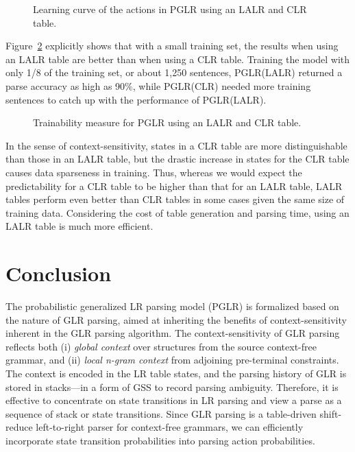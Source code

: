 \begin{figure}[htbp]
  \begin{center}
    \leavevmode
    \epsfxsize=12cm
    
    \vspace*{2.5em}
    \epsfxsize=12cm
    \caption{Learning curve of the actions in PGLR using an LALR and
      CLR table.}
    \label{fig:train-para}
  \end{center}
\end{figure}

Figure~\ref{fig:lalr-clr} explicitly shows that with a small training
set, the results when using an LALR table are better than when using a
CLR table. Training the model with only 1/8 of the training set, or
about 1,250 sentences, PGLR(LALR) returned a parse accuracy as high as
90\%, while PGLR(CLR) needed more training sentences to catch up with
the performance of PGLR(LALR).

\begin{figure}[htbp]
  \begin{center}
    \leavevmode
    \epsfxsize=12cm
    \caption{Trainability measure for PGLR using an LALR and CLR table.}
    \vspace*{-1.5em}
    \label{fig:lalr-clr}
  \end{center}
\end{figure}

In the sense of context-sensitivity, states in a CLR table are more
distinguishable than those in an LALR table, but the drastic increase in
states for the CLR table causes data sparseness in training. Thus,
whereas we would expect the predictability for a CLR table to be higher
than that for an LALR table, LALR tables perform even better than CLR
tables in some cases given the same size of training data. Considering
the cost of table generation and parsing time, using an LALR table is
much more efficient.

\section{Conclusion}
\label{sec:conclusion}
The probabilistic generalized LR parsing model (PGLR) is formalized
based on the nature of GLR parsing, aimed at inheriting the benefits of
context-sensitivity inherent in the GLR parsing algorithm. The
context-sensitivity of GLR parsing reflects both (i) {\it global
context} over structures from the source context-free grammar, and (ii)
{\it local n-gram context} from adjoining pre-terminal constraints. The
context is encoded in the LR table states, and the parsing history of
GLR is stored in stacks---in a form of GSS to record parsing
ambiguity. Therefore, it is effective to concentrate on state
transitions in LR parsing and view a parse as a sequence of stack or
state transitions.  Since GLR parsing is a table-driven shift-reduce
left-to-right parser for context-free grammars, we can efficiently
incorporate state transition probabilities into parsing action
probabilities.

